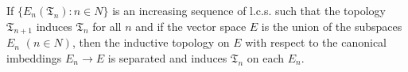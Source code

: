 If $\{E_n(\mathfrak{T}_n): n \in N\}$ is an increasing sequence of l.c.s. such that the topology $\mathfrak{T}_{n+1}$ induces $\mathfrak{T}_n$ for all $n$ and if the vector space $E$ is the union of the subspaces $E_n$ $(n \in N)$, then the inductive topology on $E$ with respect to the canonical imbeddings $E_n \rightarrow E$ is separated and induces $\mathfrak{T}_n$ on each $E_n$.
